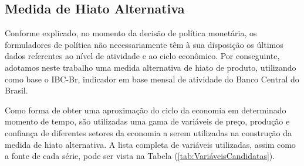 \documentclass[
	article,			%
	11pt,				%
	oneside,			%
	a4paper,			%
	english,			%
	brazil,				%
	]{abntex2}
\begin{document}
\begin{appendices}
\chapter{Medida de Hiato Alternativa}

	Conforme explicado, no momento da decisão de política monetária, os formuladores de política não necessariamente têm à sua disposição os últimos dados referentes ao nível de atividade e ao ciclo econômico. Por conseguinte, adotamos neste trabalho uma medida alternativa de hiato de produto, utilizando como base o IBC-Br, indicador em base mensal de atividade do Banco Central do Brasil.
	
	Como forma de obter uma aproximação do ciclo da economia em determinado momento de tempo, são utilizadas uma gama de variáveis de preço, produção e confiança de diferentes setores da economia a serem utilizadas na construção da medida de hiato alternativa. A lista completa de variáveis utilizadas, assim como a fonte de cada série, pode ser vista na Tabela (\ref{tab:VariáveisCandidatas}).
	

\end{appendices}
\end{document}
